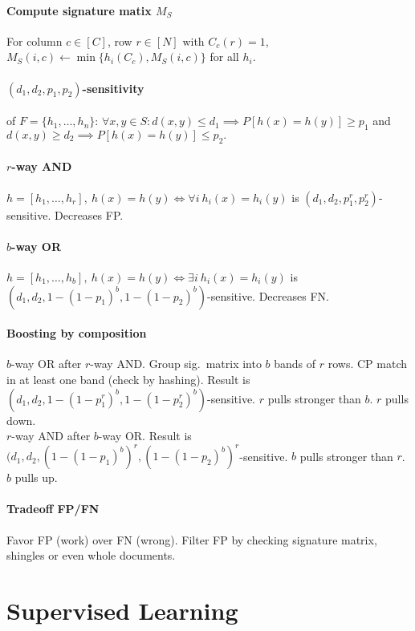 \documentclass[11pt]{scrartcl}
\begin{document}
\begin{multicols}{3}
\paragraph{Compute signature matix $M_S$}
For column $c \in [C]$, row $r \in [N]$ with $C_c(r) = 1$, $M_S(i,c) \leftarrow \min\{h_i(C_c), M_S(i,c)\}$ for all $h_i$.

\paragraph{$(d_1,d_2,p_1,p_2)$-sensitivity} of $F = \{h_1,\dots,h_n\}$: $\forall x,y \in S: d(x,y) \leq d_1 \implies P[h(x)=h(y)] \geq p_1$ and $d(x,y) \geq d_2 \implies P[h(x)=h(y)] \leq p_2.$
\paragraph{$r$-way AND}
$h = [h_1,\dots,h_r],\ h(x) = h(y) \Leftrightarrow \forall i\ h_i(x) = h_i(y)$ is $(d_1,d_2,p_1^r,p_2^r)$-sensitive. Decreases FP.
\paragraph{$b$-way OR}
$h = [h_1,\dots,h_b],\ h(x) = h(y) \Leftrightarrow \exists i\ h_i(x) = h_i(y)$ is $(d_1,d_2,1-(1-p_1)^b,1-(1-p_2)^b)$-sensitive. Decreases FN.

\paragraph{Boosting by composition}
$b$-way OR after $r$-way AND.
Group sig.\ matrix into $b$ bands of $r$ rows.
CP match in at least one band (check by hashing).
Result is $(d_1,d_2,1-(1-p_1^r)^b,1-(1-p_2^r)^b)$-sensitive. $r$ pulls stronger than $b$. $r$ pulls down.
\\
$r$-way AND after $b$-way OR.
Result is $(d_1,d_2,(1-(1-p_1)^b)^r,(1-(1-p_2)^b)^r$-sensitive. $b$ pulls stronger than $r$. $b$ pulls up.

\paragraph{Tradeoff FP/FN}
Favor FP (work) over FN (wrong).
Filter FP by checking signature matrix, shingles or even whole documents.


\section{Supervised Learning}

\end{multicols}
\end{document}

